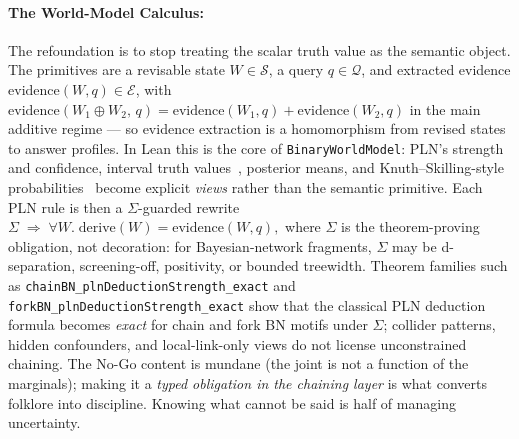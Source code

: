 \documentclass{easychair}
\newcommand{\Ev}{\ensuremath{\mathcal{E}}}
\newcommand{\State}{\ensuremath{\mathcal{S}}}
\newcommand{\Query}{\ensuremath{\mathcal{Q}}}
\newcommand{\revise}{\mathbin{\oplus}}
\newcommand{\side}{\Sigma}
\renewcommand{\code}[1]{\texttt{#1}}
\begin{document}
\paragraph*{The World-Model Calculus:}
The refoundation is to stop treating the scalar truth value as the semantic object.  The primitives are a revisable state $W \in \State$, a query $q \in \Query$, and extracted evidence $\mathrm{evidence}(W,q) \in \Ev$, with $\mathrm{evidence}(W_1 \revise W_2,\,q) = \mathrm{evidence}(W_1,q) + \mathrm{evidence}(W_2,q)$ in the main additive regime --- so evidence extraction is a homomorphism from revised states to answer profiles.  In Lean this is the core of \code{BinaryWorldModel}: PLN's strength and confidence, interval truth values~\cite{halpern2003}, posterior means, and Knuth--Skilling-style probabilities~\cite{KnuthSkilling2012} become explicit \emph{views} rather than the semantic primitive.  Each PLN rule is then a $\side$-guarded rewrite
$\side \;\Rightarrow\; \forall W.\; \mathrm{derive}(W) = \mathrm{evidence}(W,q),$
where $\side$ is the theorem-proving obligation, not decoration: for Bayesian-network fragments, $\side$ may be d-separation, screening-off, positivity, or bounded treewidth.  Theorem families such as \code{chainBN\_plnDeductionStrength\_exact} and \code{forkBN\_plnDeductionStrength\_exact} show that the classical PLN deduction formula becomes \emph{exact} for chain and fork BN motifs under $\side$; collider patterns, hidden confounders, and local-link-only views do not license unconstrained chaining.  The No-Go content is mundane (the joint is not a function of the marginals); making it a \emph{typed obligation in the chaining layer} is what converts folklore into discipline.  Knowing what cannot be said is half of managing uncertainty.

\vspace{-3mm}
\end{document}
